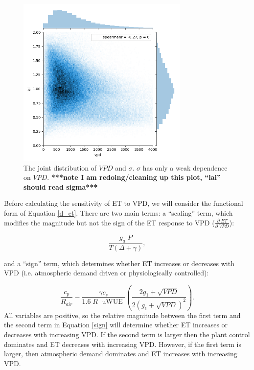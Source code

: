 \documentclass[draft,linenumbers]{gcbjournal}
\begin{document}
\begin{figure}[!p]
\centering
\includegraphics[width=20pc]{./fig03.png}
\caption{The joint distribution of $VPD$ and $\sigma$. $\sigma$ has only a weak dependence on $VPD$. \textbf{***note I am redoing/cleaning up this plot, ``lai'' should read sigma***}}
\label{lai_vpd_fig}
\end{figure}

Before calculating the sensitivity of ET to VPD, we will consider the functional form of Equation \ref{d_et}. There are two main terms: a ``scaling'' term, which modifies the magnitude but not the sign of the ET response to VPD  ($\frac{\partial \; ET}{\partial \; VPD}$):

\begin{equation}
  \frac{g_a \; P}{T(\Delta + \gamma)},
\end{equation}

and a ``sign'' term, which determines whether ET increases or decreases with VPD (i.e. atmospheric demand driven or physiologically controlled):

\begin{equation}
  \label{sign}
  \frac{c_p}{R_{air}} - \frac{\gamma c_s }{1.6 \; R\; \text{ uWUE }} \left( \frac{2 g_1 + \sqrt{VPD}}{2 (g_1 + \sqrt{VPD})^2}\right).
\end{equation}
All variables are positive, so the relative magnitude between the first term and the second term in Equation \ref{sign} will determine whether ET increases or decreases with increasing VPD. If the second term is larger then the plant control dominates and ET decreases with increasing VPD. However, if the first term is larger, then atmospheric demand dominates and ET increases with increasing VPD. 
\end{document}
